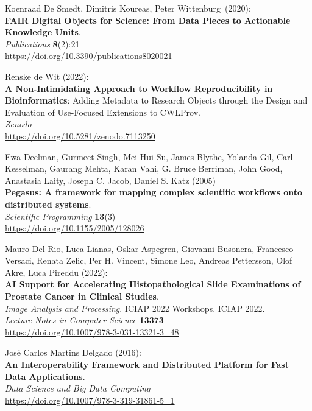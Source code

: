 \begin{thebibliography}{9}
Koenraad De Smedt, Dimitris Koureas, Peter
Wittenburg~(2020):\\
\textbf{FAIR Digital Objects for Science: From Data Pieces to Actionable
Knowledge Units}.\\
\emph{Publications} \textbf{8}(2):21\\
\url{https://doi.org/10.3390/publications8020021}

Renske de Wit (2022):\\
\textbf{A Non-Intimidating Approach to Workflow Reproducibility in Bioinformatics}: Adding Metadata to Research Objects through the Design and Evaluation of Use-Focused Extensions to CWLProv.\\
\emph{Zenodo}\\
\url{https://doi.org/10.5281/zenodo.7113250}

Ewa Deelman, Gurmeet Singh, Mei-Hui Su, James Blythe, Yolanda Gil, Carl Kesselman, Gaurang Mehta, Karan Vahi, G. Bruce Berriman, John Good, Anastasia Laity, Joseph C. Jacob, Daniel S. Katz (2005)\\
\textbf{Pegasus: A framework for mapping complex scientific workflows onto distributed systems}.\\
\emph{Scientific Programming} \textbf{13}(3) \\
\url{https://doi.org/10.1155/2005/128026}

Mauro Del Rio, Luca Lianas, Oskar Aspegren, Giovanni Busonera, Francesco Versaci, Renata Zelic, Per H. Vincent, Simone Leo, Andreas Pettersson, Olof Akre, Luca Pireddu (2022):\\
\textbf{AI Support for Accelerating Histopathological Slide Examinations of Prostate Cancer in Clinical Studies}.\\
\emph{Image Analysis and Processing}. ICIAP 2022 Workshops. ICIAP 2022. \\
\emph{Lecture Notes in Computer Science} \textbf{13373}\\
\url{https://doi.org/10.1007/978-3-031-13321-3_48}

José Carlos Martins Delgado (2016): \\
\textbf{An Interoperability Framework and Distributed Platform for Fast Data Applications}.\\
\emph{Data Science and Big Data Computing} \\
\url{https://doi.org/10.1007/978-3-319-31861-5_1}


\end{thebibliography}
